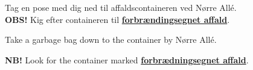 \documentclass{article}
\begin{document}
\maketitle

\null
\vspace{-1.0cm}


\vspace{-0.5in}

\begin{center}

\huge Tag en pose med dig ned til affaldscontaineren ved Nørre Allé. \\
\textbf{OBS!} Kig efter containeren til \underline{\textbf{forbrændingsegnet affald}}.

\end{center}

\english


\vspace{-0.5in}

\begin{center}

\huge Take a garbage bag down to the container by Nørre Allé.

\textbf{NB!} Look for the container marked \underline{\textbf{forbrædningsegnet affald}}.

\end{center}

\dansk

\underskriv
\end{document}
